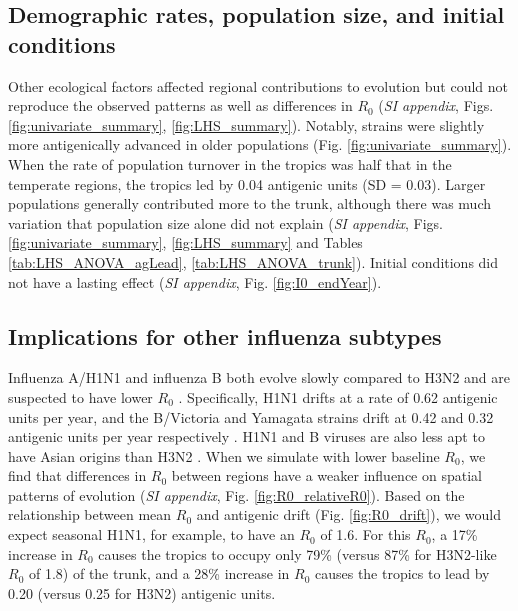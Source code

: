 \documentclass[10pt]{article}
\begin{document}
\subsection{Demographic rates, population size, and initial conditions}
Other ecological factors affected regional contributions to evolution but could not reproduce the observed patterns as well as differences in $R_0$ (\textit{SI appendix}, Figs.  \ref{fig:univariate_summary},  \ref{fig:LHS_summary}). 
Notably, strains were slightly more antigenically advanced in older populations (Fig. \ref{fig:univariate_summary}). 
When the rate of population turnover in the tropics was half that in the temperate regions, the tropics led by 0.04 antigenic units (SD = 0.03).
Larger populations generally contributed more to the trunk, although there was much variation that population size alone did not explain (\textit{SI appendix}, Figs. \ref{fig:univariate_summary}, \ref{fig:LHS_summary} and Tables \ref{tab:LHS_ANOVA_agLead}, \ref{tab:LHS_ANOVA_trunk}). 
Initial conditions did not have a lasting effect (\textit{SI appendix}, Fig. \ref{fig:I0_endYear}).

\subsection{Implications for other influenza subtypes}
Influenza A/H1N1 and influenza B both evolve slowly compared to H3N2 and are suspected to have lower $R_0$ \cite{Bedford:2015fj, Bedford:2014bf}. 
Specifically, H1N1 drifts at a rate of 0.62 antigenic units per year, and the B/Victoria and Yamagata strains drift at 0.42 and 0.32 antigenic units per year respectively \cite{Bedford:2014bf}. 
H1N1 and B viruses are also less apt to have Asian origins than H3N2 \cite{Bedford:2015fj}. 
When we simulate with lower baseline $R_0$, we find that differences in $R_0$ between regions have a weaker influence on spatial patterns of evolution (\textit{SI appendix}, Fig. \ref{fig:R0_relativeR0}). 
Based on the relationship between mean $R_0$ and antigenic drift (Fig. \ref{fig:R0_drift}), we would expect seasonal H1N1, for example, to have an $R_0$ of 1.6. 
For this $R_0$, a 17\% increase in $R_0$ causes the tropics to occupy only 79\% (versus 87\% for H3N2-like $R_0$ of 1.8) of the trunk, and a 28\% increase in $R_0$ causes the tropics to lead by 0.20 (versus 0.25 for H3N2) antigenic units.
\end{document}
